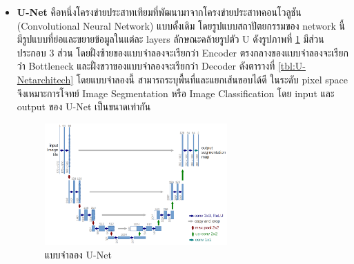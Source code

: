 \documentclass[12pt,oneside,openright,a4paper]{cpe-thai-project}
\begin{document}
\begin{itemize}
\pagebreak
\item\textbf{U-Net}
คือหนึ่งโครงข่ายประสาทเทียมที่พัฒนามาจากโครงข่ายประสาทคอนโวลูชัน (Convolutional Neural Network) แบบดั้งเดิม โดยรูปแบบสถาปัตยกรรมของ network นี้มีรูปแบบที่ย่อและขยายข้อมูลในแต่ละ layers ลักษณะคล้ายรูปตัว U ดังรูปภาพที่ \ref{fig:U-Net} มีส่วนประกอบ 3 ส่วน โดยฝั่งซ้ายของแบบจำลองจะเรียกว่า Encoder ตรงกลางของแบบจำลองจะเรียกว่่า Bottleneck และฝั่งขวาของแบบจำลองจะเรียกว่า Decoder ดังตารางที่ \ref{tbl:U-Netarchitech}
โดยแบบจำลองนี้ สามารถระบุพื้นที่และแยกเส้นขอบได้ดี ในระดับ pixel space จึงเหมาะการโจทย์ Image Segmentation หรือ Image Classification โดย input และ output ของ U-Net เป็นขนาดเท่ากัน \cite{UNet} \\
\begin{figure}[!h]\centering
\includegraphics[width=7cm]{images/unetarchitex.png}
\caption[แบบจำลอง U-Net]{แบบจำลอง U-Net \cite{img_unet}} \label{fig:U-Net}
\end{figure}
\pagebreak


\end{itemize}
\end{document}
